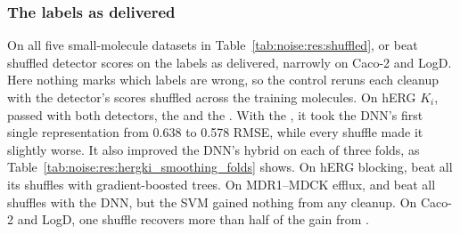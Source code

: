 \subsubsection{The labels as delivered}\label{sec:noise:res:delivered}

On all five small-molecule datasets in Table~\ref{tab:noise:res:shuffled},  or  beat shuffled detector scores on the labels as delivered, narrowly on Caco-2 and LogD. Here nothing marks which labels are wrong, so the control reruns each cleanup with the detector's scores shuffled across the training molecules. On hERG $K_i$,  passed with both detectors, the  and the . With the , it took the DNN's first single representation from 0.638 to 0.578 RMSE, while every shuffle made it slightly worse. It also improved the DNN's hybrid on each of three folds, as Table~\ref{tab:noise:res:hergki_smoothing_folds} shows. On hERG blocking,  beat all its shuffles with gradient-boosted trees. On MDR1--MDCK efflux,  and  beat all shuffles with the DNN, but the SVM gained nothing from any cleanup. On Caco-2 and LogD, one shuffle recovers more than half of the gain from .


